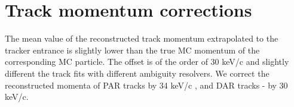 

\section{Track momentum corrections}

The mean value of the reconstructed track momentum extrapolated to the tracker entrance is
slightly lower than the true MC momentum of the corresponding MC particle.
The offset is of the order of 30 keV/c and slightly different the track fits with different
ambiguity resolvers.
We correct the reconstructed momenta of PAR tracks by 34 keV/c , and DAR tracks - by 30 keV/c.

